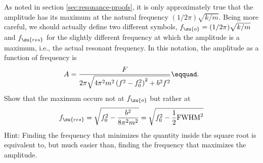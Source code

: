  As noted in section \ref{sec:resonance-proofs}, it is only approximately true
that the amplitude has its maximum at the natural frequency $(1/2\pi)\sqrt{k/m}$. Being more
careful, we should actually define two different symbols,
$f_\zu{o}=(1/2\pi)\sqrt{k/m}$ and $f_\zu{res}$ for the slightly different frequency at
which the amplitude is a maximum, i.e., the actual resonant
frequency. In this notation, the amplitude as a function of frequency is
\begin{equation*}
 A = \frac{F}{2\pi\sqrt{4\pi^2m^2\left(f^2-f_0^2\right)^2+b^2f^2}}\eqquad.
\end{equation*}
Show that the maximum occurs not at $f_\zu{o}$ but rather at 
\begin{equation*}
 f_\zu{res} = \sqrt{f_0^2-\frac{b^2}{8\pi^2m^2}} = \sqrt{f_0^2-\frac{1}{2}\text{FWHM}^2}
\end{equation*}
Hint: Finding the frequency that minimizes the quantity
inside the square root is equivalent to, but much easier
than, finding the frequency that maximizes the amplitude.
